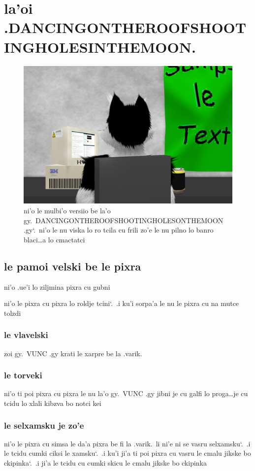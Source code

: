 \documentclass{report}
\newcommand\sds{\spacefactor\sfcode`.\ \space}
\begin{document}
\chapter{la'oi .DANCINGONTHEROOFSHOOTINGHOLESINTHEMOON.}
\begin{figure}[ht]
	\centering
	\includegraphics[width=\textwidth]{dancingontheroofshootingholesinthemoon/dancingontheroofshootingholesinthemoon.png}
	\caption[center]{ni'o le mulbi'o versiio be la'o gy.\ DANCINGONTHEROOFSHOOTINGHOLESONTHEMOON .gy\sds  ni'o le nu viska lo ro tcila cu frili zo'e le nu pilno lo banro blaci\ldots a lo cmactatci}
\end{figure}
\section{le pamoi velski be le pixra}
ni'o .ue'i lo ziljmina pixra cu gubni

ni'o le pixra cu pixra lo roldje tcini\sds  .i ku'i sorpa'a le nu le pixra cu na mutce tolzdi

\subsection{le vlavelski}
zoi gy.\ VUNC .gy krati le xarpre be la .varik.
\subsection{le torveki}
ni'o ti poi pixra cu pixra le nu la'o gy.\ VUNC .gy jibni je cu galfi lo proga\ldots je cu tcidu lo xlali kibzva bo notci kei

\subsection{le selxamsku je zo'e}
ni'o le pixra cu simsa le da'a pixra be fi la .varik.\ li ni'e ni se vasru selxamsku\sds  .i le tcidu cumki ciksi le xamsku\sds  .i ku'i ji'a ti poi pixra cu vasru le cmalu jikske bo ckipinka\sds  .i ji'a le tcidu cu cumki skicu le cmalu jikske bo ckipinka
\end{document}

